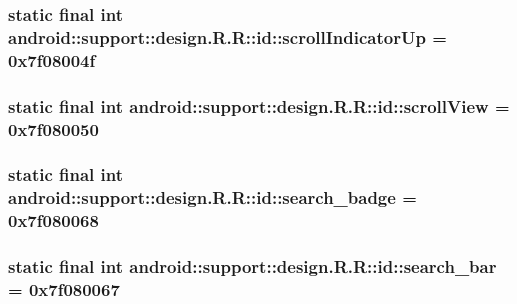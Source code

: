 \hypertarget{classandroid_1_1support_1_1design_1_1_r_1_1id_740a36afa6cc99e94caa5d0d04cf7283}{
\subsubsection[{scrollIndicatorUp}]{\setlength{\rightskip}{0pt plus 5cm}static final int android::support::design.R.R::id::scrollIndicatorUp = 0x7f08004f}}
\label{classandroid_1_1support_1_1design_1_1_r_1_1id_740a36afa6cc99e94caa5d0d04cf7283}


\hypertarget{classandroid_1_1support_1_1design_1_1_r_1_1id_7554e23d0591146f3494f63c2ea68bbd}{
\subsubsection[{scrollView}]{\setlength{\rightskip}{0pt plus 5cm}static final int android::support::design.R.R::id::scrollView = 0x7f080050}}
\label{classandroid_1_1support_1_1design_1_1_r_1_1id_7554e23d0591146f3494f63c2ea68bbd}


\hypertarget{classandroid_1_1support_1_1design_1_1_r_1_1id_264de98a4a9c1f31b8bdb47476bcbd56}{
\subsubsection[{search\_\-badge}]{\setlength{\rightskip}{0pt plus 5cm}static final int android::support::design.R.R::id::search\_\-badge = 0x7f080068}}
\label{classandroid_1_1support_1_1design_1_1_r_1_1id_264de98a4a9c1f31b8bdb47476bcbd56}


\hypertarget{classandroid_1_1support_1_1design_1_1_r_1_1id_0a59bde3896f6d86958ca115fd6b2c69}{
\subsubsection[{search\_\-bar}]{\setlength{\rightskip}{0pt plus 5cm}static final int android::support::design.R.R::id::search\_\-bar = 0x7f080067}}
\label{classandroid_1_1support_1_1design_1_1_r_1_1id_0a59bde3896f6d86958ca115fd6b2c69}


